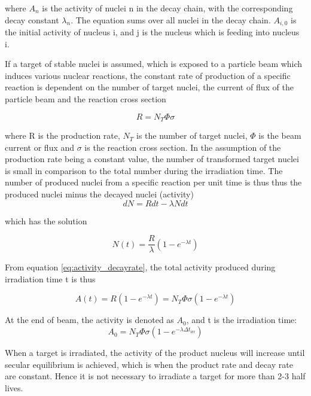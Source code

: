 where $A_n$ is the activity of nuclei n in the decay chain, with the corresponding decay constant $\lambda_n$. The equation sums over all nuclei in the decay chain. $A_{i,0}$ is the initial activity of nucleus i, and j is the nucleus which is feeding into nucleus i. 

\noindent 
If a target of stable nuclei is assumed, which is exposed to a particle beam which induces various nuclear reactions, the constant rate of production of a specific reaction is dependent on the number of target nuclei, the current of flux of the particle beam and the reaction cross section

\begin{equation}
    R = N_T \Phi \sigma
\end{equation}

\noindent 
where R is the production rate, $N_T$ is the number of target nuclei, $\Phi$ is the beam current or flux and $\sigma$ is the reaction cross section. In the assumption of the production rate being a constant value, the number of transformed target nuclei is small in comparison to the total number during the irradiation time. The number of produced nuclei from a specific reaction per unit time is thus thus the produced nuclei minus the decayed nuclei (activity)
\begin{equation}
    dN = Rdt - \lambda N dt
\end{equation}

which has the solution

\begin{equation}
    N(t) = \frac{R}{\lambda}(1-e^{-\lambda t})
\end{equation}

From equation \ref{eq:activity_decayrate}, the total activity produced during irradiation time t is thus 

\begin{equation} 
    A(t) = R(1-e^{-\lambda t}) = N_T \Phi \sigma (1-e^{-\lambda t})
\end{equation}

At the end of beam, the activity is denoted as $A_0$, and t is the irradiation time:
\begin{equation} \label{eq:activity_eob}
    A_0 = N_T \Phi \sigma (1-e^{-\lambda \Delta t_\text{irr}})
\end{equation}

\noindent 
When a target is irradiated, the activity of the product nucleus will increase until secular equilibrium is achieved, which is when the product rate and decay rate are constant. Hence it is not necessary to irradiate a target for more than 2-3 half lives.\\

